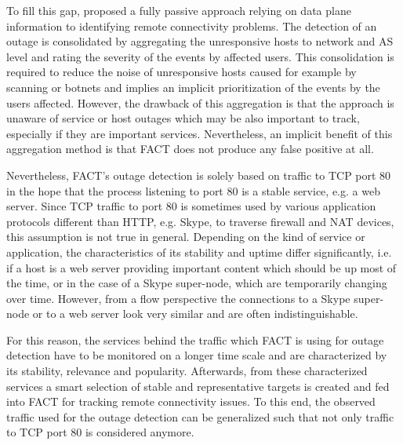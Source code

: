To fill this gap, \citet{SchatzmannPAM2011} proposed a fully passive approach relying on data plane information to identifying remote connectivity problems. The detection of an outage is consolidated by aggregating the unresponsive hosts to network and AS level and rating the severity of the events by affected users. This consolidation is required to reduce the noise of unresponsive hosts caused for example by scanning or botnets and implies an implicit prioritization of the events by the users affected. However, the drawback of this aggregation is that the approach is unaware of service or host outages which may be also important to track, especially if they are important services. Nevertheless, an implicit benefit of this aggregation method is that FACT does not produce any false positive at all.

Nevertheless, FACT's outage detection is solely based on traffic to TCP port 80 in the hope that the process listening to port 80 is a stable service, e.g. a web server. Since TCP traffic to port 80 is sometimes used by various application protocols different than HTTP, e.g. Skype, to traverse firewall and NAT devices, this assumption is not true in general. Depending on the kind of service or application, the characteristics of its stability and uptime differ significantly, i.e. if a host is a web server providing important content which should be up most of the time, or in the case of a Skype super-node, which are temporarily changing over time. However, from a flow perspective the connections to a Skype super-node or to a web server look very similar and are often indistinguishable.

For this reason, the services behind the traffic which FACT is using for outage detection have to be monitored on a longer time scale and are characterized by its stability, relevance and popularity. Afterwards, from these characterized services a smart selection of stable and representative targets is created and fed into FACT for tracking remote connectivity issues. To this end, the observed traffic used for the outage detection can be generalized such that not only traffic to TCP port 80 is considered anymore. 


